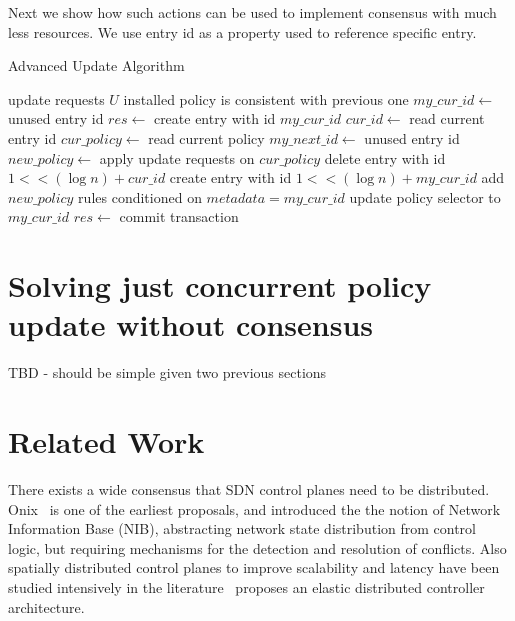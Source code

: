 \documentclass[conference]{sigcomm-alternate}
\begin{document}
Next we show how such actions can be used to implement consensus with much less resources. We use entry id as a property used to reference specific entry.

\begin{algorithm}[t]
    \caption{Advanced Update Algorithm}
    \label{alg:template}
    \begin{algorithmic}[1]
    \Require update requests $U$
    \Ensure installed policy is consistent with previous one
		\Repeat
			\State $my\_cur\_id\gets$ unused entry id
    		\State $res \gets $ create entry with id $my\_cur\_id$
    \EndIf
 		\Repeat
 			\State $cur\_id\gets$ read current entry id
 			\State $cur\_policy\gets$ read current policy
 			\State $my\_next\_id\gets$ unused entry id
 			\State $new\_policy\gets$ apply update requests on $cur\_policy$
 			\startTransaction
	 			\State delete entry with id $1<<(\log n) + cur\_id$
	 			\State create entry with id $1<<(\log n) + my\_cur\_id$
	 			\State add $new\_policy$ rules conditioned on $metadata=my\_cur\_id$
	 			\State update policy selector to $my\_cur\_id$
 			\endTransaction
     		\State $res \gets $ commit transaction

    \end{algorithmic}
\end{algorithm}


\section{Solving just concurrent policy update without consensus}\label{sec:todo}

TBD - should be simple given two previous sections


\section{Related Work}\label{sec:relwork}

There exists a wide consensus that SDN control planes need to be distributed.~\cite{onos,onix,elasticon} 
Onix~\cite{onix} is one of the earliest proposals, and introduced the 
the notion of Network Information Base (NIB), abstracting network state
distribution from control logic, but 
requiring mechanisms for the detection and resolution of conflicts. 
Also spatially distributed control planes to improve scalability and
latency have been studied intensively
in the literature~\cite{kandoo,ctrl-place,hotsdn13loc}
proposes an elastic distributed controller architecture. 
\end{document}
